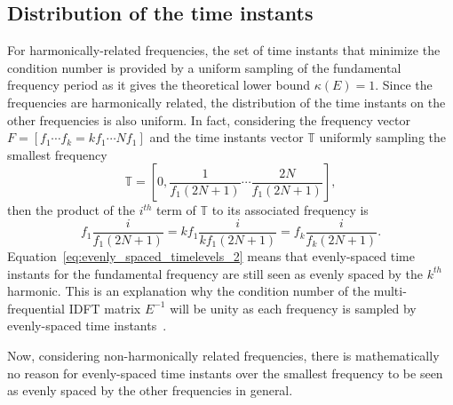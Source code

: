\subsection{Distribution of the time instants}
For harmonically-related frequencies, the set of time instants
that minimize the condition number is 
provided by a uniform sampling of the fundamental frequency period
as it gives the theoretical lower bound $\kappa (E) = 1$. Since the
frequencies are harmonically related, the distribution of the time
instants on the other frequencies is also uniform. 
In fact, considering the
frequency vector $F = \left[f_1 \cdots f_k= kf_1 \cdots Nf_1 \right]$
and the time instants vector
$\mathbb{T}$ uniformly sampling the smallest frequency
\begin{equation}
  \mathbb{T} = \left[0, \frac{1}{f_1 (2N+1)} \cdots  \frac{2N}{f_1 (2N+1)} \right],
  \label{eq:evenly_spaced_timelevels}
\end{equation}
then the product of the $i^{th}$ term of $\mathbb{T}$ to its
associated frequency is
\begin{equation}
  f_1 \frac{i}{f_1 (2N+1)} = k f_1 \frac{i}{k f_1 (2N+1)} = f_k \frac{i}{f_k (2N+1)}.
  \label{eq:evenly_spaced_timelevels_2}
\end{equation}
Equation~\eqref{eq:evenly_spaced_timelevels_2} means that evenly-spaced
time instants for the fundamental frequency are still seen 
as evenly spaced by the $k^{th}$ harmonic. This is an explanation why the
condition number of the multi-frequential IDFT matrix $E^{-1}$ will be
unity as each frequency is sampled by evenly-spaced time
instants~\cite{Brambilla1999}.

Now, considering non-harmonically related frequencies, there is
mathematically no reason for evenly-spaced time instants over the
smallest frequency to be seen as evenly spaced by the other frequencies
in general.

